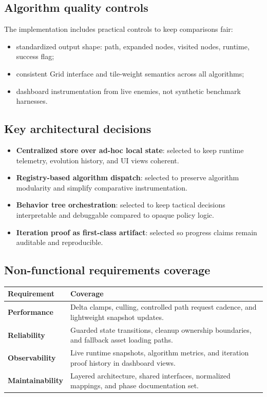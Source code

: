 \documentclass[11pt,a4paper,twoside]{article}
\begin{document}
\subsection{Algorithm quality controls}
The implementation includes practical controls to keep comparisons fair:
\begin{itemize}[leftmargin=6mm]
  \item standardized output shape: path, expanded nodes, visited nodes, runtime, success flag;
  \item consistent Grid interface and tile-weight semantics across all algorithms;
  \item dashboard instrumentation from live enemies, not synthetic benchmark harnesses.
\end{itemize}

\subsection{Key architectural decisions}
\begin{itemize}[leftmargin=6mm]
  \item \textbf{Centralized store over ad-hoc local state}: selected to keep runtime telemetry, evolution history, and UI views coherent.
  \item \textbf{Registry-based algorithm dispatch}: selected to preserve algorithm modularity and simplify comparative instrumentation.
  \item \textbf{Behavior tree orchestration}: selected to keep tactical decisions interpretable and debuggable compared to opaque policy logic.
  \item \textbf{Iteration proof as first-class artifact}: selected so progress claims remain auditable and reproducible.
\end{itemize}

\subsection{Non-functional requirements coverage}
\begin{center}
\begin{tabular}{>{\bfseries}p{3.3cm} p{8.9cm}}
\toprule
Requirement & Coverage \\
\midrule
Performance & Delta clamps, culling, controlled path request cadence, and lightweight snapshot updates. \\
Reliability & Guarded state transitions, cleanup ownership boundaries, and fallback asset loading paths. \\
Observability & Live runtime snapshots, algorithm metrics, and iteration proof history in dashboard views. \\
Maintainability & Layered architecture, shared interfaces, normalized mappings, and phase documentation set. \\
\bottomrule
\end{tabular}
\end{center}
\end{document}
